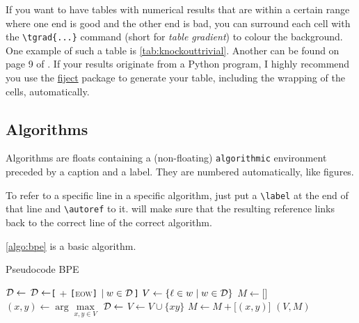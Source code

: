 If you want to have tables with numerical results that are within a certain range where one end is good and the other end is bad, you can surround each cell with the \verb|\tgrad{...}| command (short for \emph{table gradient}) to colour the background. One example of such a table is \autoref{tab:knockouttrivial}. Another can be found on page 9 of \textcite{bauwens_bpe-knockout_2024}. If your results originate from a Python program, I highly recommend you use the \href{https://github.com/bauwenst/fiject}{\textsf{fiject}} package to generate your table, including the wrapping of the cells, automatically.
 
\subsection{Algorithms}
Algorithms are floats containing a (non-floating) \verb|algorithmic| environment preceded by a caption and a label. They are numbered automatically, like figures.

To refer to a specific line in a specific algorithm, just put a \verb|\label| at the end of that line and \verb|\autoref| to it. \repo will make sure that the resulting reference links back to the correct line of the correct algorithm.

\autoref{algo:bpe} is a basic algorithm.
\begin{algorithm}[H]
	\caption{Pseudocode BPE}
	\label{algo:bpe}
	\begin{algorithmic}[1]
			\State $\mathcal{D} \gets$ 
			\State $\mathcal{D} \gets$\texttt{[} + \texttt{[}\textsc{eow}\texttt{]} $\mid w\in \mathcal{D}$\texttt{]} 
			\State $V \gets \{\ell \in w \mid w \in \mathcal{D}\}$\label{line:bpeinit}
			\State $M \gets \texttt{[]}$
				\State $(x,y) \gets \arg\max\limits_{x,y\in V}$ \label{line:bpeargmax}
				\State $\mathcal{D}\gets$ \label{line:replace}
				\State $V\gets V \cup \{xy\}$
				\State $M\gets M + \texttt{[}(x,y)\texttt{]}$
			\EndWhile
			\vspace{-0.31em}\State\Return $(V,M)$
		\EndFunction
	\end{algorithmic}
\end{algorithm}

